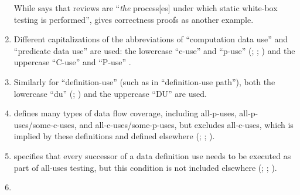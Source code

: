 \begin{enumerate}
          While \citet[p.~92\ifnotpaper, emphasis added\fi]{Patton2006}
          says that reviews are ``\emph{the} process[es] under which static
          white-box testing is performed'', \citet[pp.~418\==419]{vanVliet2000}
          gives correctness proofs as another example.
    \item %
          Different capitalizations of the abbreviations of ``computation data
          use'' and ``predicate data use'' are used: the lowercase ``\acs{c-use}''
          and ``\acs{p-use}'' (\citealp[pp.~3, 27\==29, 35\==36, 114\==155,
              117\==118, 129]{IEEE2021c}; \citeyear[p.~124]{IEEE2017};
          \citealp[p.~477, Tab.~12.6]{PetersAndPedrycz2000}) and the uppercase
          ``C-use'' and ``P-use'' \citep[pp.~424\==425]{vanVliet2000}.
    \item %
          Similarly for ``definition-use'' (such as in ``definition-use
          path''), both the lowercase ``du'' (\citealp[pp.~3, 27, 29, 35,
              119\==121, 129]{IEEE2021c}; \citealp[pp.~478\==479]{
              PetersAndPedrycz2000}) and the uppercase ``DU''
          \citep[p.~425]{vanVliet2000} are used.
    \item %
           defines many types of data
          flow coverage, including all-\acsp{p-use},
          all-\acsp{p-use}/some-\acsp{c-use}, and
          all-\acsp{c-use}/some-\acsp{p-use}, but
          excludes all-\acsp{c-use}, which is implied by these definitions and
          defined elsewhere (\citealp[p.~27]{IEEE2021c};
          \citeyear[p.~83]{IEEE2017}; \citealp[p.~479]{PetersAndPedrycz2000}).
    \item %
           specifies that every
          successor of a data definition use needs to be executed as part of
          all-uses testing, but this condition is not included elsewhere
          (\citealp[pp.~28\==29]{IEEE2021c}; \citeyear[p.~120]{IEEE2017};
          \citealp[pp.~478\==479]{PetersAndPedrycz2000}).
    \item %

\end{enumerate}
